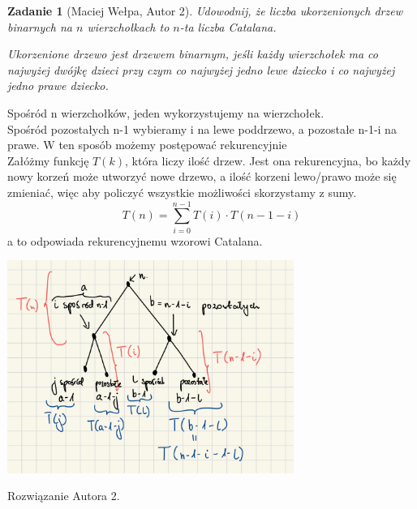 \documentclass{mwart}
\newtheorem{zad}{Zadanie}[section]
\begin{document}
\begin{zad}[Maciej Wełpa, Autor 2]
    Udowodnij, że liczba ukorzenionych drzew binarnych na $n$ wierzchołkach to $n$-ta liczba Catalana.

    Ukorzenione drzewo jest drzewem binarnym, jeśli każdy wierzchołek ma co najwyżej
    dwójkę dzieci przy czym co najwyżej jedno lewe dziecko i co najwyżej jedno prawe dziecko.
\end{zad}
\begin{mdframed}
    Spośród n wierzchołków, jeden wykorzystujemy na wierzchołek.\\
    Spośród pozostałych n-1 wybieramy i na lewe poddrzewo, a pozostałe n-1-i na prawe. W ten sposób możemy postępować rekurencyjnie\\
    Załóżmy funkcję \( T(k) \), która liczy ilość drzew. Jest ona rekurencyjna, bo każdy nowy korzeń może utworzyć nowe drzewo, a ilość korzeni lewo/prawo może się zmieniać, więc aby policzyć wszystkie możliwości skorzystamy z sumy.
    \[
    T(n) = \sum_{i=0}^{n-1} T(i) \cdot T(n-1-i)
    \]
    a to odpowiada rekurencyjnemu wzorowi Catalana.
    \begin{center}
    \includegraphics[width=0.7\textwidth]{images/zad36.jpeg}
\end{center}

\end{mdframed}
\begin{mdframed}
    Rozwiązanie Autora 2.
\end{mdframed}
\end{document}
